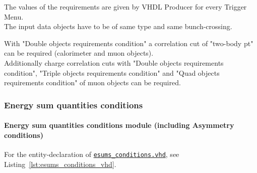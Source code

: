 The values of the requirements are given by VHDL Producer for every Trigger Menu.\\
The input data objects have to be of same type and same bunch-crossing.

With "Double objects requirements condition" a correlation cut of "two-body pt" can be required (calorimeter and muon objects).\\
Additionally charge correlation cuts with "Double objects requirements condition", "Triple objects requirements condition" and "Quad objects requirements condition" of muon objects can be required.

\clearpage

\subsubsection{Energy sum quantities conditions}
\label{sec:gtl:esums_conditions}

\paragraph{Energy sum quantities conditions module (including Asymmetry conditions)}

For the entity-declaration of \href{https://github.com/cms-l1-globaltrigger/mp7_ugt_legacy/tree/master/firmware/hdl/gt_mp7_core/gtl_fdl_wrapper/gtl/esums_conditions.vhd}{\texttt{esums\_conditions.vhd}}, see Listing~\ref{lst:esums_conditions_vhd}.



